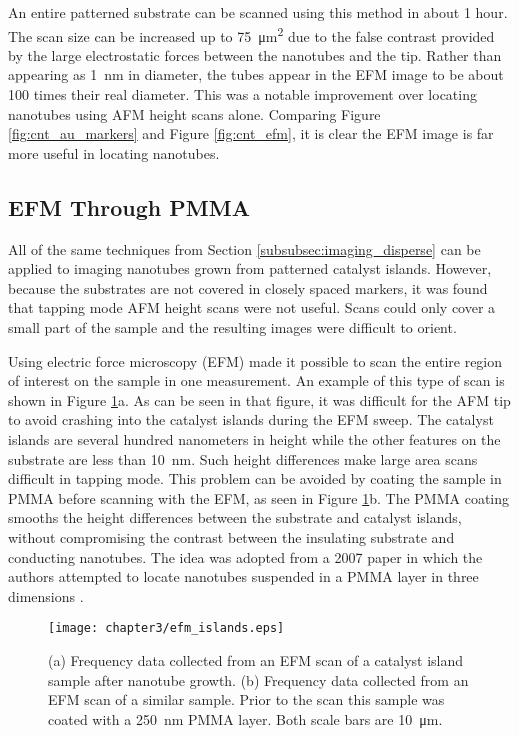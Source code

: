 An entire patterned substrate can be scanned using this method in about 1 hour. The scan size can be increased up to \SI{75}{\square\micro\meter} due to the false contrast provided by the large electrostatic forces between the nanotubes and the tip. Rather than appearing as \SI{1}{\nano\meter} in diameter, the tubes appear in the EFM image to be about 100 times their real diameter. This was a notable improvement over locating nanotubes using AFM height scans alone. Comparing Figure \ref{fig:cnt_au_markers} and Figure \ref{fig:cnt_efm}, it is clear the EFM image is far more useful in locating nanotubes.

\subsection{EFM Through PMMA}

All of the same techniques from Section \ref{subsubsec:imaging_disperse} can be applied to imaging nanotubes grown from patterned catalyst islands. However, because the substrates are not covered in closely spaced markers, it was found that tapping mode AFM height scans were not useful. Scans could only cover a small part of the sample and the resulting images were difficult to orient.

Using electric force microscopy (EFM) made it possible to scan the entire region of interest on the sample in one measurement. An example of this type of scan is shown in Figure \ref{fig:efm_islands}a. As can be seen in that figure, it was difficult for the AFM tip to avoid crashing into the catalyst islands during the EFM sweep. The catalyst islands are several hundred nanometers in height while the other features on the substrate are less than \SI{10}{\nano\meter}. Such height differences make large area scans difficult in tapping mode. This problem can be avoided by coating the sample in PMMA before scanning with the EFM, as seen in Figure \ref{fig:efm_islands}b. The PMMA coating smooths the height differences between the substrate and catalyst islands, without compromising the contrast between the insulating substrate and conducting nanotubes. The idea was adopted from a 2007 paper in which the authors attempted to locate nanotubes suspended in a PMMA layer in three dimensions \cite{Jespersen2007}.

\begin{figure}
	\centering
	\texttt{[image: chapter3/efm\_islands.eps]}
	\caption{(a) Frequency data collected from an EFM scan of a catalyst island sample after nanotube growth. (b) Frequency data collected from an EFM scan of a similar sample. Prior to the scan this sample was coated with a \SI{250}{\nano\meter} PMMA layer. Both scale bars are \SI{10}{\micro\meter}. }
	\label{fig:efm_islands}
\end{figure}


